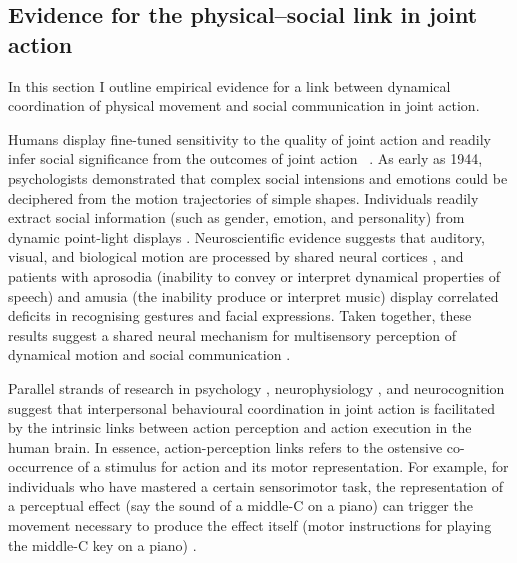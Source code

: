 \begin{CJK}{UTF8}{gbsn}

\subsection{Evidence for the physical--social link in joint action}
In this section I outline empirical evidence for a link between dynamical coordination of physical movement and social communication in joint action.

Humans display fine-tuned sensitivity to the quality of joint action and readily infer social significance from the outcomes of joint action ~\citep{Wheatley2016}.  As early as 1944, psychologists \textcite{Heider1944} demonstrated that complex social intensions and emotions could be deciphered from the motion trajectories of simple shapes.  Individuals readily extract social information (such as gender, emotion, and personality) from dynamic point-light displays \citep{Atkinson2004,Clark2005a,Johansson1973}.  Neuroscientific evidence suggests that auditory, visual, and biological motion
are processed by shared neural cortices \citep[e.g., the right superior temporal cortex; see][]{Zatorre2007,Beaucousin2007,Beauchamp2007}, and patients with aprosodia (inability to convey or interpret dynamical properties of speech) and amusia (the inability produce or interpret music) display correlated deficits in recognising gestures and facial expressions.  Taken together, these results suggest a shared neural mechanism for multisensory perception of dynamical motion and social communication \citep{Wheatley2012,Wheatley2016}.

Parallel strands of research in psychology \citep{Prinz1990,Prinz1997,Prinz2013}, neurophysiology \citep{Rizzolatti2004,Rizzolatti2010}, and neurocognition \citep{Wolpert1998,Wolpert2000} suggest that interpersonal behavioural coordination in joint action is facilitated by the intrinsic links between action perception and action execution in the human brain.  In essence, action-perception links refers to the ostensive co-occurrence of a stimulus for action and its motor representation.  For example, for individuals who have mastered a certain sensorimotor task, the representation of a perceptual effect (say the sound of a middle-C on a piano) can trigger the movement necessary to produce the effect itself (motor instructions for playing the middle-C key on a piano) \citep{Novembre2014}.


\end{CJK}
